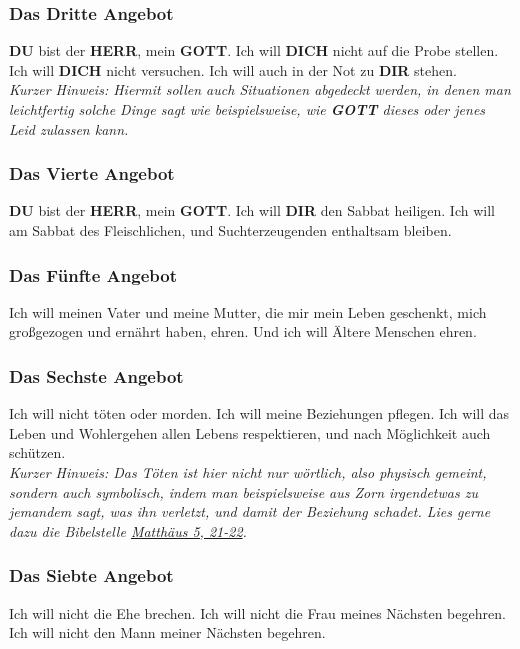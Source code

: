 \documentclass[12pt,a4paper]{article}
\newcommand{\Dich}[0]{\textbf{DICH}}
\newcommand{\Dir}[0]{\textbf{DIR}}
\newcommand{\Du}[0]{\textbf{DU}}
\newcommand{\Gott}[0]{\textbf{GOTT}}
\newcommand{\Herr}[0]{\textbf{HERR}}
\begin{document}
	\subsubsection{Das Dritte Angebot}
		{\Du} bist der {\Herr},
		mein {\Gott}.
		Ich will {\Dich} nicht auf die Probe stellen.
		Ich will {\Dich} nicht versuchen.
		Ich will auch in der Not zu {\Dir} stehen.
		\\
		\textit{Kurzer Hinweis:
		Hiermit sollen auch Situationen abgedeckt werden,
		in denen man leichtfertig solche Dinge sagt wie beispielsweise,
		wie {\Gott} dieses oder jenes Leid zulassen kann.}
		
	\subsubsection{Das Vierte Angebot}
		{\Du} bist der {\Herr},
		mein {\Gott}.
		Ich will {\Dir} den Sabbat heiligen.
		Ich will am Sabbat des Fleischlichen,
		und Suchterzeugenden enthaltsam bleiben.
		
	\subsubsection{Das F\"unfte Angebot}
		Ich will meinen Vater und meine Mutter,
		die mir mein Leben geschenkt,
		mich gro{\ss}gezogen und ern\"ahrt haben,
		ehren.
		Und ich will \"Altere Menschen ehren.
			
	\subsubsection{Das Sechste Angebot} \label{DasSechsteAngebot}
		Ich will nicht t\"oten oder morden.
		Ich will meine Beziehungen pflegen.
		Ich will das Leben und Wohlergehen allen Lebens respektieren,
		und nach M\"oglichkeit auch sch\"utzen.
		\\
		\textit{Kurzer Hinweis:
		Das T\"oten ist hier nicht nur w\"ortlich,
		also physisch gemeint,
		sondern auch symbolisch,
		indem man beispielsweise aus Zorn irgendetwas zu jemandem sagt,
		was ihn verletzt,
		und damit der Beziehung schadet.
		Lies gerne dazu die Bibelstelle \href{https://www.die-bibel.de/bibeln/online-bibeln/lesen/LU17/MAT.5/Matthäus-5}{Matthäus 5, 21-22}.}
		
	\subsubsection{Das Siebte Angebot}
		Ich will nicht die Ehe brechen.
		Ich will nicht die Frau meines N\"achsten begehren.
		Ich will nicht den Mann meiner N\"achsten begehren.
		
\end{document}
